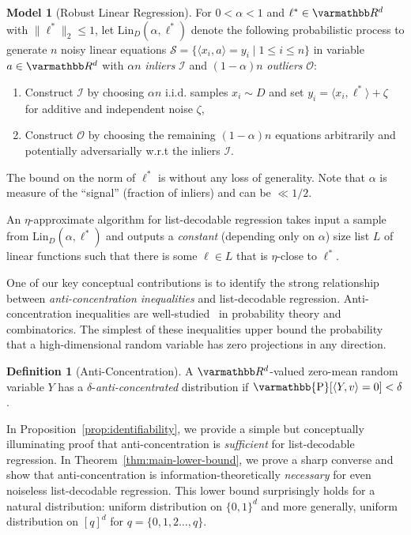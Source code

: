 \documentclass{article}
\theoremstyle{definition}
\newtheorem{definition}[theorem]{Definition}
\newtheorem{model}[theorem]{Model}
\theoremstyle{remark}
\let\mathbb\varmathbb
\newcommand{\set}[1]{\{#1\}}
\newcommand{\iprod}[1]{\langle#1\rangle}
\newcommand{\Psymb}{\mathbb{P}}
\DeclareMathOperator*{\ProbOp}{\Psymb}
\renewcommand{\Pr}{\ProbOp}
\newcommand{\R}{\mathbb R}
\newcommand{\cI}{\mathcal I}
\newcommand{\cO}{\mathcal O}
\newcommand{\cS}{\mathcal S}
\renewcommand{\leq}{\leqslant}
\numberwithin{equation}{section}
\newcommand*{\zo}{\set{0,1}}
\newcommand{\1}{\bm{1}}
\newcommand{\Lin}{\mathrm{Lin}}
\begin{document}
\begin{model}[Robust Linear Regression]
	For $0 <\alpha < 1$ and $\ell^* \in \R^d$ with $\|\ell^*\|_2 \leq 1$, let $\Lin_D(\alpha,\ell^*)$ denote the following probabilistic process to generate $n$ noisy linear equations $\cS = \{ \langle x_i, a \rangle = y_i\mid 1\leq i \leq n\}$ in variable $a \in \R^d$ with $\alpha n$ \emph{inliers} $\cI$ and $(1-\alpha)n$ \emph{outliers} $\cO$:
	\begin{enumerate}
		\item Construct $\cI$ by choosing $\alpha n$ i.i.d. samples $x_i \sim D$ and set $y_i = \langle x_i,\ell^* \rangle + \zeta$ for additive and independent noise $\zeta$,
		\item Construct $\cO$ by  choosing the remaining $(1-\alpha)n$ equations arbitrarily and potentially adversarially w.r.t the inliers $\cI$.
	\end{enumerate}
	\label{model:random-equations}
\end{model}
The bound on the norm of $\ell^*$ is without any loss of generality. 
Note that $\alpha$ is measure of the ``signal'' (fraction of inliers) and can be $\ll 1/2$. 

An $\eta$-approximate algorithm for list-decodable regression takes input a sample from $\Lin_D(\alpha,\ell^*)$ and outputs a \emph{constant} (depending only on $\alpha$) size list $L$ of linear functions such that there is some $\ell \in L$ that is $\eta$-close to $\ell^*$.

One of our key conceptual contributions is to identify the strong relationship between \emph{anti-concentration inequalities} and list-decodable regression. Anti-concentration inequalities are well-studied~\cite{ErdosLittlewoodOfford,MR2965282-Tao12,MR2407948-Rudelson08} in probability theory and combinatorics. The simplest of these inequalities upper bound the probability that a high-dimensional random variable has zero projections in any direction.

\begin{definition}[Anti-Concentration]
	A $\R^d$-valued zero-mean random variable $Y$ has a $\delta$-\emph{anti-concentrated} distribution if $\Pr[ \iprod{Y,v}=0 ]< \delta$. 
\end{definition}

In Proposition~\ref{prop:identifiability}, we provide a simple but conceptually illuminating proof that anti-concentration is \emph{sufficient} for list-decodable regression. In Theorem~\ref{thm:main-lower-bound}, we prove a sharp converse and show that anti-concentration is information-theoretically \emph{necessary} for even noiseless list-decodable regression. This lower bound surprisingly holds for a natural distribution: uniform distribution on $\zo^d$ and more generally, uniform distribution on $[q]^d$ for  $q = \{0,1,2\ldots,q\}$.
\end{document}
